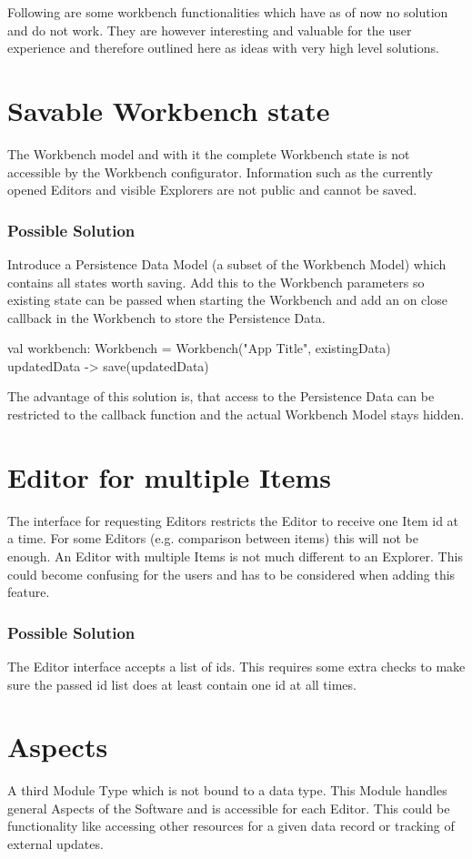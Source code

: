 Following are some workbench functionalities which have as of now no solution and do not work. They are however interesting and valuable for the user experience and therefore outlined here as ideas with very high level solutions.

\section{Savable Workbench state}
The Workbench model and with it the complete Workbench state is not accessible by the Workbench configurator. Information such as the currently opened Editors and visible Explorers are not public and cannot be saved.

\subsubsection{Possible Solution}
Introduce a Persistence Data Model (a subset of the Workbench Model) which contains all states worth saving. Add this to the Workbench parameters so existing state can be passed when starting the Workbench and add an on close callback in the Workbench to store the Persistence Data.
\begin{kotlincode}
    val workbench: Workbench = Workbench("App Title", existingData) {
        updatedData ->
            save(updatedData)
    }
\end{kotlincode}
The advantage of this solution is, that access to the Persistence Data can be restricted to the callback function and the actual Workbench Model stays hidden.

\section{Editor for multiple Items}
The interface for requesting Editors restricts the Editor to receive one Item id at a time. For some Editors (e.g. comparison between items) this will not be enough. 
An Editor with multiple Items is not much different to an Explorer. This could become confusing for the users and has to be considered when adding this feature.

\subsubsection{Possible Solution}
The Editor interface accepts a list of ids. This requires some extra checks to make sure the passed id list does at least contain one id at all times.

\section{Aspects}
A third Module Type which is not bound to a data type. This Module handles general Aspects of the Software and is accessible for each Editor. This could be functionality like accessing other resources for a given data record or tracking of external updates.

